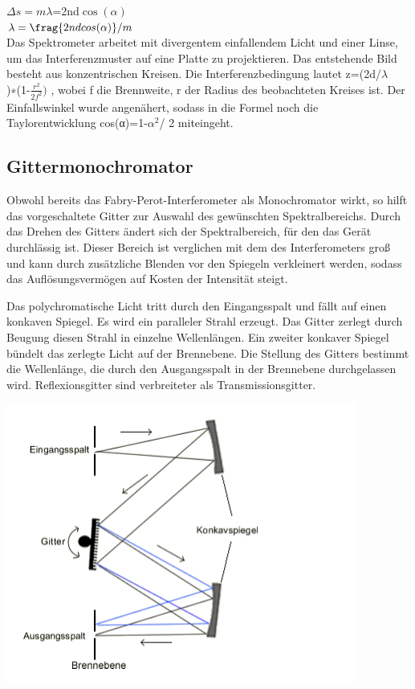 \documentclass[10pt,a4paper]{article}
\begin{document}
$\Delta s=m\lambda$=2nd$\cos(\alpha)$\\

$\lambda= \frag{2ndcos(\alpha)}/ {m} $\\

 Das Spektrometer arbeitet mit divergentem einfallendem Licht und einer Linse, um das Interferenzmuster auf eine Platte zu projektieren. Das entstehende Bild besteht aus konzentrischen Kreisen. Die Interferenzbedingung lautet z=(2d/$\lambda$ )∗(1-$\frac{r^2} {2f^2} )$ , wobei f die Brennweite, r der Radius des beobachteten Kreises ist. Der Einfallswinkel wurde angenähert, sodass in die Formel noch die Taylorentwicklung cos(α)=1-$\alpha^2$/ 2 miteingeht.
 
\subsection{ Gittermonochromator}
 
  Obwohl bereits das Fabry-Perot-Interferometer als Monochromator wirkt, so hilft das vorgeschaltete Gitter zur Auswahl des gewünschten Spektralbereichs. Durch das Drehen des Gitters ändert sich der Spektralbereich, für den das Gerät durchlässig ist. Dieser Bereich ist verglichen mit dem des Interferometers groß und kann durch zusätzliche Blenden vor den Spiegeln verkleinert werden, sodass das Auflösungsvermögen auf Kosten der Intensität steigt. 
  
  Das polychromatische Licht tritt durch den Eingangsspalt und fällt auf einen konkaven Spiegel. Es wird ein paralleler Strahl erzeugt. Das Gitter zerlegt durch Beugung diesen Strahl in einzelne Wellenlängen. Ein zweiter konkaver Spiegel bündelt das zerlegte Licht auf der Brennebene. Die Stellung des Gitters bestimmt die Wellenlänge, die durch den Ausgangsspalt in der Brennebene durchgelassen wird. Reflexionsgitter sind verbreiteter als Transmissionsgitter.
  
  \includegraphics{gitter}
  
\end{document}
